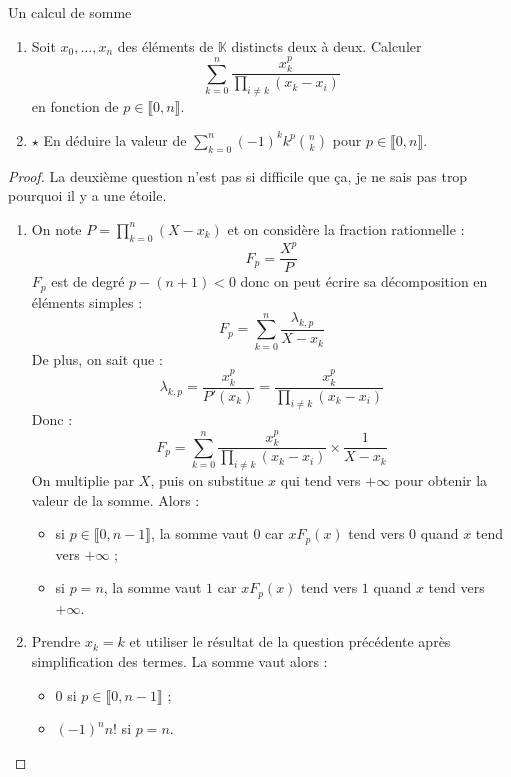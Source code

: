 \documentclass[french,a4paper]{article}
\newcommand{\K}{\mathbb{K}}
\theoremstyle{plain}
\theoremstyle{definition}
\theoremstyle{remark}
\begin{document}
\begin{ex}{Un calcul de somme}
	\begin{enumerate}
		\item Soit $x_0,\ldots,x_n$ des éléments de $\K$ distincts deux à deux. Calculer $$\sum_{k=0}^{n}\frac{x_k^p}{\prod_{i\ne k}(x_k-x_i)}$$ en fonction de $p\in\llbracket0,n\rrbracket$.
		\item $\star$ En déduire la valeur de $\displaystyle\sum_{k=0}^{n}(-1)^kk^p\binom{n}{k}$ pour $p\in\llbracket0,n\rrbracket$.
	\end{enumerate}
\end{ex}
\begin{proof}
	La deuxième question n'est pas si difficile que ça, je ne sais pas trop pourquoi il y a une étoile.
	\begin{enumerate}
		\item On note $P=\displaystyle\prod_{k=0}^{n}(X-x_k)$ et on considère la fraction rationnelle : $$F_p=\frac{X^p}{P}$$ $F_p$ est de degré $p-(n+1)<0$ donc on peut écrire sa décomposition en éléments simples : $$F_p=\sum_{k=0}^{n}\frac{\lambda_{k,p}}{X-x_k}$$ De plus, on sait que : $$\lambda_{k,p}=\frac{x_k^p}{P'(x_k)}=\frac{x_k^p}{\prod_{i\ne k}(x_k-x_i)}$$ Donc : $$F_p=\sum_{k=0}^{n}\frac{x_k^p}{\prod_{i\ne k}(x_k-x_i)}\times\frac{1}{X-x_k}$$ On multiplie par $X$, puis on substitue $x$ qui tend vers $+\infty$ pour obtenir la valeur de la somme. Alors : 
		\begin{itemize}
			\item si $p\in\llbracket0,n-1\rrbracket$, la somme vaut $0$ car $xF_p(x)$ tend vers $0$ quand $x$ tend vers $+\infty$ ;
			\item si $p=n$, la somme vaut $1$ car $xF_p(x)$ tend vers $1$ quand $x$ tend vers $+\infty$.
		\end{itemize}
		\item Prendre $x_k=k$ et utiliser le résultat de la question précédente après simplification des termes. La somme vaut alors :
		\begin{itemize}
			\item $0$ si $p\in\llbracket0,n-1\rrbracket$ ;
			\item $(-1)^nn!$ si $p=n$.
		\end{itemize}
	\end{enumerate}
\end{proof}
\end{document}
